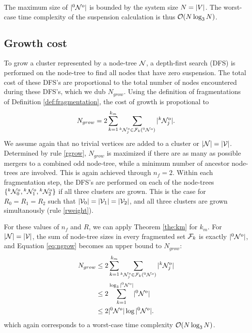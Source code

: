 The maximum size of $\lvert{}^{0}\mathcal{N}^o\rvert$ is bounded by the system size $N = \lvert V\rvert$. The worst-case time complexity of the suspension calculation is thus $\mathcal{O}(N\log_3{N})$. 

\subsection{Growth cost}\label{sec:growthcost}

To grow a cluster represented by a node-tree $\mathcal{N}$, a depth-first search (DFS) is performed on the node-tree to find all nodes that have zero suspension. The total cost of these DFS's are proportional to the total number of nodes encountered during these DFS's, which we dub $N_{grow}$. Using the definition of fragmentations of Definition \ref{def:fragmentation}, the cost of growth is propotional to
\begin{equation}\label{eq:ngrow}
  N_{grow} = 2\sum_{k=1}^{k_{m}}{ \sum_{ \pre{k}\nset_j^o \in \m{F}_k(\pre{0}\nset^o) }{ \abs{\pre{k}\nset_j^o} } }.
\end{equation}
We assume again that no trivial vertices are added  to a cluster or $|\mathcal{N}| = |\mathcal{V}|$. Determined by rule \ref{rgrow}, $N_{grow}$ is maximized if there are as many as possible mergers to a combined odd node-tree, while a minimum number of ancestor node-trees are involved. This is again achieved through $n_f = 2$. Within each fragmentation step, the DFS's are performed on each of the node-trees $\{{}^{k}\mathcal{N}^o_0, {}^{k}\mathcal{N}^o_1, {}^{k}\mathcal{N}^o_2\}$ if all three clusters are grown. This is the case for $R_0 = R_1 = R_2$ such that $\lvert\mathcal{V}_0\rvert= \lvert\mathcal{V}_1\rvert=\lvert\mathcal{V}_2\rvert$, and all three clusters are grown simultanously (rule \ref{rweight}). 

For these values of $n_f$ and $R$, we can apply Theorem \ref{the:km} for $k_m$. For $|\mathcal{N}| = |\mathcal{V}|$, the sum of node-tree sizes in every fragmented set $\mathcal{F}_k$ is exactly $\lvert{}^{0}\mathcal{N}^o\rvert$, and Equation \eqref{eq:ngrow} becomes an upper bound to $N_{grow}$: 
\begin{align}
  \nonumber N_{grow} &\leq 2\sum_{k=1}^{k_{m}}{ \sum_{{}^{k}\mathcal{N}_j^o \in \mathcal{F}_k({}^{0}\mathcal{N}^o)}{ \lvert{}^{k}\mathcal{N}_j^o\rvert } } \\
  \nonumber         &\leq 2\sum_{k=1}^{\log_3{\lvert{}^{0}\mathcal{N}^o\rvert}} \lvert{}^{0}\mathcal{N}^o\rvert\\
                    &\leq 2\lvert{}^{0}\mathcal{N}^o\rvert\log{\lvert {}^{0} \mathcal{N}^o\rvert}.
\end{align}
which again corresponds to a worst-case time complexity $\mathcal{O}(N\log_3{N})$.